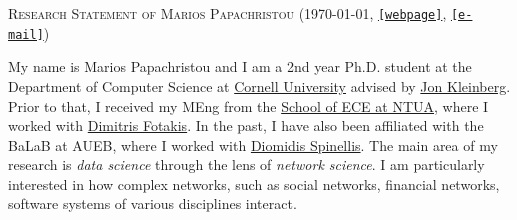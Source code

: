 \documentclass[11pt]{article}
\begin{document}
\begin{center}
\large \textsc{Research Statement of Marios Papachristou} \normalsize {(\today, \href{https://papachristoumarios.github.io}{\texttt{[webpage]}}, \href{mailto:papachristoumarios@cs.cornell.edu}{\texttt{[e-mail]}})} 
\end{center}

\medskip


My name is Marios Papachristou and I am a 2nd year Ph.D. student at the Department of Computer Science at \href{https://www.cs.cornell.edu}{Cornell University} advised by \href{https://www.cs.cornell.edu/home/kleinber}{Jon Kleinberg}. Prior to that, I received my MEng from the \href{https://www.ece.ntua.gr/gr}{School of ECE at NTUA}, where I worked with \href{http://www.softlab.ntua.gr/~fotakis/}{Dimitris Fotakis}. In the past, I have also been affiliated with the BaLaB at AUEB, where I worked with \href{https://www2.dmst.aueb.gr/dds}{Diomidis Spinellis}. The main area of my research is \emph{data science} through the lens of \emph{network science}. I am particularly interested in how complex networks, such as social networks,  financial networks, software systems  of various disciplines interact. 
\end{document}
